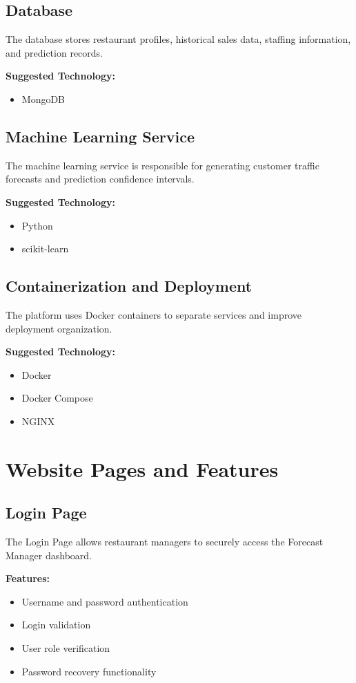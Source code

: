 \documentclass[12pt]{article}
\begin{document}
\subsection{Database}
The database stores restaurant profiles, historical sales data, staffing information, and prediction records.

\textbf{Suggested Technology:}
\begin{itemize}
\item MongoDB
\end{itemize}

\subsection{Machine Learning Service}
The machine learning service is responsible for generating customer traffic forecasts and prediction confidence intervals.

\textbf{Suggested Technology:}
\begin{itemize}
\item Python
\item scikit-learn
\end{itemize}

\subsection{Containerization and Deployment}
The platform uses Docker containers to separate services and improve deployment organization.

\textbf{Suggested Technology:}
\begin{itemize}
\item Docker
\item Docker Compose
\item NGINX
\end{itemize}

\section{Website Pages and Features}

\subsection{Login Page}
The Login Page allows restaurant managers to securely access the Forecast Manager dashboard.

\textbf{Features:}
\begin{itemize}
\item Username and password authentication
\item Login validation
\item User role verification
\item Password recovery functionality
\end{itemize}
\end{document}
